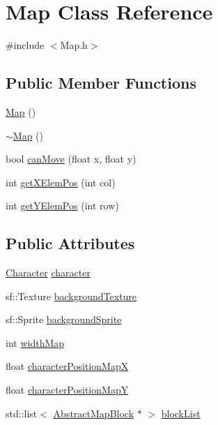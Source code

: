 \hypertarget{class_map}{}\section{Map Class Reference}
\label{class_map}


{\ttfamily \#include $<$Map.\+h$>$}

\subsection*{Public Member Functions}
\begin{DoxyCompactItemize}
\item 
\hyperlink{class_map_a0f5ad0fd4563497b4214038cbca8b582}{Map} ()
\item 
\hyperlink{class_map_aa403fbe09394ccf39747588f5168e3b2}{$\sim$\+Map} ()
\item 
bool \hyperlink{class_map_a9e0db2b7f0c2cc2083da543050f0fa91}{can\+Move} (float x, float y)
\item 
int \hyperlink{class_map_a46c8ba4683ce97e3f5120be02b0ace94}{get\+X\+Elem\+Pos} (int col)
\item 
int \hyperlink{class_map_a8efab6f1e807cb4cb576fc5dcfed3075}{get\+Y\+Elem\+Pos} (int row)
\end{DoxyCompactItemize}
\subsection*{Public Attributes}
\begin{DoxyCompactItemize}
\item 
\hyperlink{class_character}{Character} \hyperlink{class_map_a00d7fac6e87f2ac95d0182bbb22fdac4}{character}
\item 
sf\+::\+Texture \hyperlink{class_map_a18202f9ebc5ddab14652bdacc81e3c72}{background\+Texture}
\item 
sf\+::\+Sprite \hyperlink{class_map_aa92b0ecd899641e3385613efcd037f65}{background\+Sprite}
\item 
int \hyperlink{class_map_ac62ec077cb012a9fe7d987b466a48947}{width\+Map}
\item 
float \hyperlink{class_map_acfd2fda55638ba32a092fac314f9f1c5}{character\+Position\+MapX}
\item 
float \hyperlink{class_map_aa4e4d68c7babc74782b973a3b97431ea}{character\+Position\+MapY}
\item 
std\+::list$<$ \hyperlink{class_abstract_map_block}{Abstract\+Map\+Block} $\ast$ $>$ \hyperlink{class_map_ad185fe5369037999533e218f3f7ade8a}{block\+List}
\end{DoxyCompactItemize}


